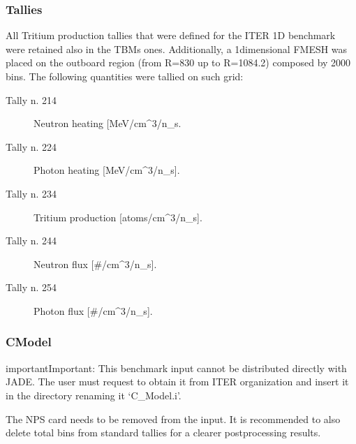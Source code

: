 \documentclass[letterpaper,10pt,english]{sphinxmanual}
\begin{document}
\subsubsection{Tallies}
\label{\detokenize{usage/benchmarks:id4}}
\sphinxAtStartPar
All Tritium production tallies that were defined for the ITER 1D benchmark
were retained also in the TBMs ones.
Additionally, a 1\sphinxhyphen{}dimensional FMESH was placed on the outboard region
(from R=830 up to R=1084.2) composed by 2000 bins. The following quantities
were tallied on such grid:
\begin{description}
\item[{Tally n. 214}] \leavevmode
\sphinxAtStartPar
Neutron heating {[}MeV/cm\textasciicircum{}3/n\_s.

\item[{Tally n. 224}] \leavevmode
\sphinxAtStartPar
Photon heating {[}MeV/cm\textasciicircum{}3/n\_s{]}.

\item[{Tally n. 234}] \leavevmode
\sphinxAtStartPar
Tritium production {[}atoms/cm\textasciicircum{}3/n\_s{]}.

\item[{Tally n. 244}] \leavevmode
\sphinxAtStartPar
Neutron flux {[}\#/cm\textasciicircum{}3/n\_s{]}.

\item[{Tally n. 254}] \leavevmode
\sphinxAtStartPar
Photon flux {[}\#/cm\textasciicircum{}3/n\_s{]}.

\end{description}


\nopagebreak


\sphinxAtStartPar
{\hyperref[\detokenize{usage/benchmarks:iter1ddesc}]{}}




\subsubsection{C\sphinxhyphen{}Model}
\label{\detokenize{usage/benchmarks:c-model}}
\begin{sphinxadmonition}{important}{Important:}
\sphinxAtStartPar
This benchmark input cannot be distributed directly with JADE. The user must request to obtain it
from ITER organization and insert it in the  directory renaming it
‘C\_Model.i’.

\sphinxAtStartPar
The NPS card needs to be removed from the input. It is recommended to also delete total bins
from standard tallies for a clearer post\sphinxhyphen{}processing results.
\end{sphinxadmonition}
\end{document}
